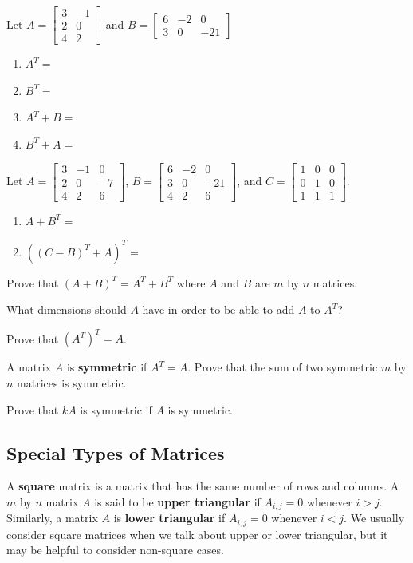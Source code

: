 \bq Let $A=\begin{bmatrix} 3&-1 \\2&0 \\ 4&2 \end{bmatrix}$ and $B=\begin{bmatrix} 6&-2&0 \\3&0&-21 \end{bmatrix}$
\begin{enumerate}
\item $A^T=$
\item $B^T=$
\item $A^T+B=$
\item $B^T+A=$
\end{enumerate}
\eq

\bq Let $A=\begin{bmatrix} 3&-1&0 \\2&0&-7 \\ 4&2&6 \end{bmatrix}$, $B=\begin{bmatrix} 6&-2&0 \\3&0&-21 \\ 4&2&6 \end{bmatrix}$, \break and $C=\begin{bmatrix} 1&0&0 \\0&1&0\\1&1&1 \end{bmatrix}$.
\begin{enumerate}
\item $A+B^T=$
\item $((C-B)^T+A)^T=$
\end{enumerate}
\eq

\bq Prove that $(A+B)^T=A^T+B^T$ where $A$ and $B$ are $m$ by $n$ matrices.
\eq

\bq What dimensions should $A$ have in order to be able to add $A$ to $A^T$?
\eq

\bq Prove that $(A^T)^T=A$.
\eq

A matrix $A$ is \textbf{symmetric} if $A^T=A$.
\bq Prove that the sum of two symmetric $m$ by $n$ matrices is symmetric.
\eq

\bq Prove that $kA$ is symmetric if $A$ is symmetric. \eq


\subsection{Special Types of Matrices}
A \textbf{square} matrix is a matrix that has the same number of rows and columns. A $m$ by $n$ matrix $A$ is said to be \textbf{upper triangular} if $A_{i,j}=0$ whenever $i>j$. Similarly, a matrix $A$ is \textbf{lower triangular} if $A_{i,j}=0$ whenever $i<j$. We usually consider square matrices when we talk about upper or lower triangular, but it may be helpful to consider non-square cases.

